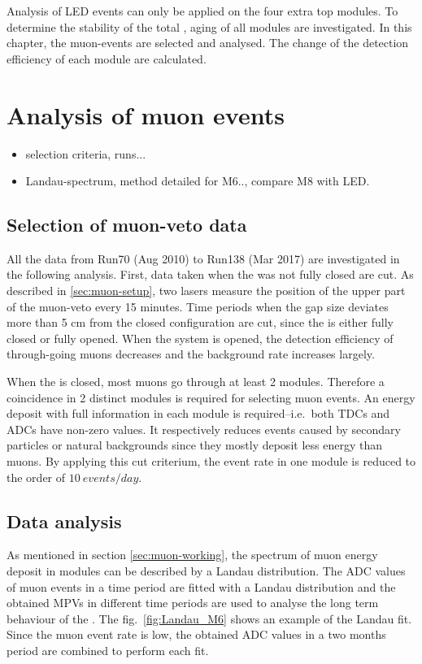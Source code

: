 Analysis of LED events can only be applied on the four extra top modules. To determine the stability of the total \mvs, aging of all modules are investigated. In this chapter, the muon-events are selected and analysed. The change of the detection efficiency of each module are calculated.

\section{Analysis of muon events}


\begin{itemize}
  \item selection criteria, runs...
  \item Landau-spectrum, method detailed for M6..,  compare M8 with LED.
\end{itemize}

\subsection{Selection of muon-veto data}
All the data from Run70 (Aug 2010) to Run138 (Mar 2017) are investigated in the following analysis. First, data taken when the \mvs{} was not fully closed are cut. As described in \ref{sec:muon-setup}, two lasers measure the position of the upper part of the muon-veto every 15 minutes. Time periods when the gap size deviates more than 5 cm from the closed configuration are cut, since the \mvs{} is either fully closed or fully opened. When the system is opened, the detection efficiency of through-going muons decreases and the background rate increases largely.

When the \mvs{} is closed, most muons go through at least 2 modules. Therefore a coincidence in 2 distinct modules is required for selecting muon events. An energy deposit with full information in each module is required--i.e.\ both TDCs and ADCs have non-zero values. It respectively reduces events caused by secondary particles or natural backgrounds since they mostly deposit less energy than muons. By applying this cut criterium, the event rate in one module is reduced to the order of $\SI{10}{events/day}$.

\subsection{Data analysis}
As mentioned in section \ref{sec:muon-working}, the spectrum of muon energy deposit in modules can be described by a Landau distribution. The ADC values of muon events in a time period are fitted with a Landau distribution and the obtained MPVs in different time periods are used to analyse the long term behaviour of the \mvs. The fig.\ \ref{fig:Landau_M6} shows an example of the Landau fit. Since the muon event rate is low, the obtained ADC values in a two months period are combined to perform each fit.


